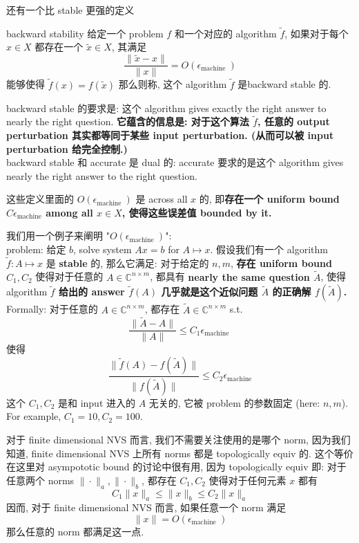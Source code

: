 \documentclass[lang=cn,11pt]{elegantbook}
\begin{document}
还有一个比 stable 更强的定义
\begin{definition}{backward stability}
    给定一个 problem $f$ 和一个对应的 algorithm $\tilde{f}$, 如果对于每个 $x \in X$ 都存在一个 $\tilde{x} \in X$, 其满足$$
\frac{\|\tilde{x}-x\|}{\|x\|}=O\left(\epsilon_{\text {machine }}\right)
$$能够使得 $\tilde{f}(x)= f(\tilde{x})$ 那么则称, 这个 algorithm $\tilde{f}$ 是backward stable 的.
\end{definition}
backward stable 的要求是: 这个 algorithm gives exactly the right answer to nearly the right question. \textbf{它蕴含的信息是: 对于这个算法 $\tilde{f}$, 任意的 output perturbation 其实都等同于某些 input perturbation. (从而可以被 input perturbation 给完全控制.)}\\
backward stable 和 accurate 是 dual 的: accurate 要求的是这个 algorithm gives nearly the right answer to the right question.\\
\begin{remark}
这些定义里面的 $O\left(\epsilon_{\text {machine }}\right)$ 是 across all $x$ 的, 即\textbf{存在一个 uniform bound $C\epsilon_{\text{machine}}$ among all $x\in X$, 使得这些误差值 bounded by it.}
\begin{example}
我们用一个例子来阐明 "$O\left(\epsilon_{\text {machine }}\right)$":\\
problem: 给定 $b$, solve system $Ax = b$ for $A \mapsto x$. 假设我们有一个 algorithm $\tilde{f}: A \mapsto x$ 是 \textbf{stable} 的, 那么它满足: 对于给定的 $n,m$, \textbf{存在 uniform bound $C_1,C_2$} 使得对于任意的 $A \in \mathbb{C}^{n\times m}$, 都具有 \textbf{nearly the same question $\tilde{A}$},  使得 algorithm \textbf{$\tilde{f}$ 给出的 answer $\tilde{f}(A)$ 几乎就是这个近似问题 $\tilde{A}$ 的正确解 $f(\tilde{A})$.}\\
Formally: 对于任意的 $A \in \mathbb{C}^{n\times m}$, 都存在  $\tilde{A} \in \mathbb{C}^{n\times m}$ s.t. \[
\frac{\|\tilde{A}-A\|}{\|A\|}\leq C_1 \epsilon_{\text {machine }}
\]使得 \[
\frac{\| \tilde{f}(A) - f(\tilde{A})\| }{\| f(\tilde{A}) \|}  \leq C_2 \epsilon_{\text{machine}}
\]
这个 $C_1,C_2$ 是和 input 进入的 $A$ 无关的, 它被 problem 的参数固定 (here: $n,m$). For example, $C_1 = 10,C_2 = 100$.
\end{example}
\end{remark}
\begin{remark}
    对于 finite dimensional NVS 而言, 我们不需要关注使用的是哪个 norm, 因为我们知道,  finite dimensional NVS 上所有 norms 都是 topologically equiv 的. 这个等价在这里对 asympototic bound 的讨论中很有用, 因为  topologically equiv 即: 对于任意两个 norms $\|\cdot\|_a,\|\cdot\|_b $, 都存在 $C_1, C_2$ 使得对于任何元素 $x$ 都有 \[
C_1   \| x\|_a \leq   \| x\|_b \leq C_2  \| x\|_a
    \]
    因而,   对于 finite dimensional NVS 而言, 如果任意一个 norm 满足$$
\| x\|=O\left(\epsilon_{\text {machine }}\right)
$$那么任意的 norm 都满足这一点.
\end{remark}
\end{document}
